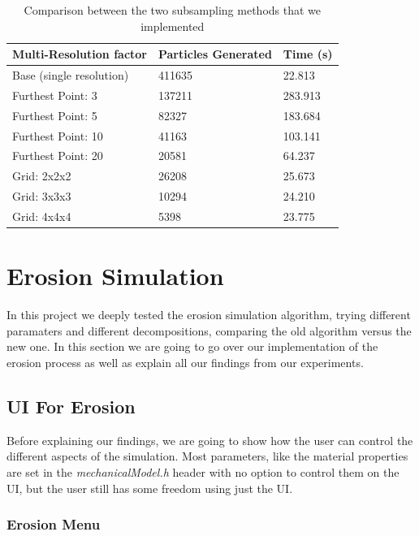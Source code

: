 \begin{table}[]
\centering

\begin{tabular}{|l|l|l|}
\hline
Multi-Resolution factor  & Particles Generated & Time (s) \\ \hline
Base (single resolution) & 411635              & 22.813     \\ \hline
Furthest Point: 3        & 137211              & 283.913    \\ \hline
Furthest Point: 5         & 82327               & 183.684    \\ \hline
Furthest Point: 10        & 41163               & 103.141    \\ \hline
Furthest Point: 20        & 20581               & 64.237     \\ \hline
Grid: 2x2x2              & 26208               & 25.673     \\ \hline
Grid: 3x3x3              & 10294               & 24.210     \\ \hline
Grid: 4x4x4              & 5398                & 23.775     \\ \hline
\end{tabular}
\caption{Comparison between the two subsampling methods that we implemented}
\label{tab:subsamplingTable}
\end{table}



\section{Erosion Simulation}
In this project we deeply tested the erosion simulation algorithm, trying 
different paramaters and different decompositions, comparing the old 
algorithm versus the new one. In this section we are going to go over 
our implementation of the erosion process as well as explain all our 
findings from our experiments.

\subsection{UI For Erosion}
Before explaining our findings, we are going to show how the user can 
control the different aspects of the simulation. Most parameters, 
like the material properties are set in the \textit{mechanicalModel.h} 
header with no option to control them on the UI, but the user still 
has some freedom using just the UI.

\subsubsection{Erosion Menu}

